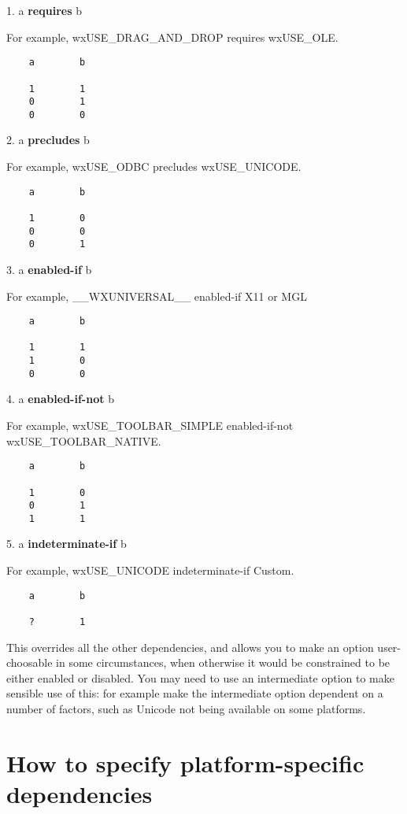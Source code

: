1. a {\bf requires} b

For example, wxUSE_DRAG_AND_DROP requires wxUSE_OLE.

\begin{verbatim}
    a        b

    1        1
    0        1
    0        0
\end{verbatim}

2. a {\bf precludes} b

For example, wxUSE_ODBC precludes wxUSE_UNICODE.

\begin{verbatim}
    a        b

    1        0
    0        0
    0        1
\end{verbatim}


3. a {\bf enabled-if} b

For example, __WXUNIVERSAL__ enabled-if X11 or MGL

\begin{verbatim}
    a        b

    1        1
    1        0
    0        0
\end{verbatim}

4. a {\bf enabled-if-not} b

For example, wxUSE_TOOLBAR_SIMPLE enabled-if-not wxUSE_TOOLBAR_NATIVE.

\begin{verbatim}
    a        b

    1        0
    0        1
    1        1
\end{verbatim}

5. a {\bf indeterminate-if} b

For example, wxUSE_UNICODE indeterminate-if Custom.

\begin{verbatim}
    a        b

    ?        1
\end{verbatim}

This overrides all the other dependencies, and allows you
to make an option user-choosable in some circumstances,
when otherwise it would be constrained to be either enabled or
disabled. You may need to use an intermediate option to
make sensible use of this: for example make the intermediate
option dependent on a number of factors, such as Unicode not being
available on some platforms.

\section{How to specify platform-specific dependencies}\label{platformdependencies}

